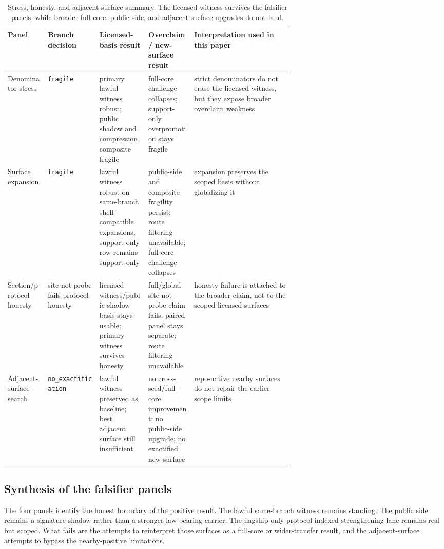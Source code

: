 \documentclass[11pt]{article}
\theoremstyle{definition}
\begin{document}
\begin{table}[t]
\centering
\footnotesize
\caption{Stress, honesty, and adjacent-surface summary. The licensed witness survives the
falsifier panels, while broader full-core, public-side, and adjacent-surface upgrades do
not land.}
\label{tab:falsifier-panels}
\begin{tabularx}{\linewidth}{@{}>{\raggedright\arraybackslash}p{0.14\linewidth}>{\raggedright\arraybackslash}p{0.18\linewidth}>{\raggedright\arraybackslash}p{0.17\linewidth}>{\raggedright\arraybackslash}p{0.16\linewidth}>{\raggedright\arraybackslash}X@{}}
\toprule
Panel & Branch decision & Licensed-basis result & Overclaim / new-surface result & Interpretation used in this paper \\
\midrule
Denominator stress & \texttt{fragile} & primary lawful witness robust; public shadow and compression composite fragile & full-core challenge collapses; support-only overpromotion stays fragile & strict denominators do not erase the licensed witness, but they expose broader overclaim weakness \\
Surface expansion & \texttt{fragile} & lawful witness robust on same-branch shell-compatible expansions; support-only row remains support-only & public-side and composite fragility persist; route filtering unavailable; full-core challenge collapses & expansion preserves the scoped basis without globalizing it \\
Section/protocol honesty & site-not-probe fails protocol honesty & licensed witness/public-shadow basis stays usable; primary witness survives honesty & full/global site-not-probe claim fails; paired panel stays separate; route filtering unavailable & honesty failure is attached to the broader claim, not to the scoped licensed surfaces \\
Adjacent-surface search & \texttt{no\_exactification} & lawful witness preserved as baseline; best adjacent surface still insufficient & no cross-seed/full-core improvement; no public-side upgrade; no exactified new surface & repo-native nearby surfaces do not repair the earlier scope limits \\
\bottomrule
\end{tabularx}
\end{table}

\subsection{Synthesis of the falsifier panels}

The four panels identify the honest boundary of the positive result. The lawful
same-branch witness remains standing. The public side remains a signature shadow
rather than a stronger law-bearing carrier. The flagship-only protocol-indexed
strengthening lane remains real but scoped. What fails are the attempts to reinterpret
those surfaces as a full-core or wider-transfer result, and the adjacent-surface
attempts to bypass the nearby-positive limitations.
\end{document}
